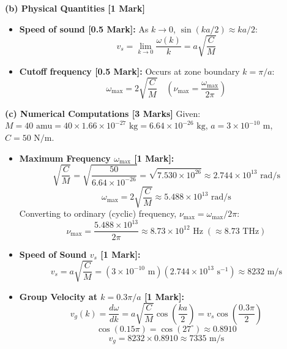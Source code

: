 \documentclass[10pt,a4paper,twocolumn]{article}
\begin{document}
\textbf{(b) Physical Quantities [1 Mark]}
\begin{itemize}
    \item \textbf{Speed of sound [0.5 Mark]:} As $k \to 0$, $\sin(ka/2) \approx ka/2$:
    $$v_s = \lim_{k \to 0} \frac{\omega(k)}{k} = a\sqrt{\frac{C}{M}}$$
    \item \textbf{Cutoff frequency [0.5 Mark]:} Occurs at zone boundary $k = \pi/a$:
    $$\omega_{\max} = 2\sqrt{\frac{C}{M}} \quad \left(\nu_{\max} = \frac{\omega_{\max}}{2\pi}\right)$$
\end{itemize}

\textbf{(c) Numerical Computations [3 Marks]}
Given: $M = 40\text{ amu} = 40 \times 1.66 \times 10^{-27}\text{ kg} = 6.64 \times 10^{-26}\text{ kg}$, $a = 3 \times 10^{-10}\text{ m}$, $C = 50\text{ N/m}$.
\begin{itemize}
    \item \textbf{Maximum Frequency $\omega_{\max}$ [1 Mark]:}
    $$\sqrt{\frac{C}{M}} = \sqrt{\frac{50}{6.64 \times 10^{-26}}} = \sqrt{7.530 \times 10^{26}} \approx 2.744 \times 10^{13}\text{ rad/s}$$
    $$\omega_{\max} = 2\sqrt{\frac{C}{M}} \approx 5.488 \times 10^{13}\text{ rad/s}$$
    Converting to ordinary (cyclic) frequency, $\nu_{\max} = \omega_{\max}/2\pi$:
    $$\nu_{\max} = \frac{5.488 \times 10^{13}}{2\pi} \approx 8.73 \times 10^{12}\text{ Hz} \;(\approx 8.73\text{ THz})$$
    \item \textbf{Speed of Sound $v_s$ [1 Mark]:}
    $$v_s = a\sqrt{\frac{C}{M}} = (3 \times 10^{-10}\text{ m})(2.744 \times 10^{13}\text{ s}^{-1}) \approx 8232\text{ m/s}$$
    \item \textbf{Group Velocity at $k = 0.3\pi/a$ [1 Mark]:}
    $$v_g(k) = \frac{d\omega}{dk} = a\sqrt{\frac{C}{M}}\cos\left(\frac{ka}{2}\right) = v_s \cos\left(\frac{0.3\pi}{2}\right)$$
    $$\cos(0.15\pi) = \cos(27^\circ) \approx 0.8910$$
    $$v_g = 8232 \times 0.8910 \approx 7335\text{ m/s}$$
\end{itemize}
\end{document}
